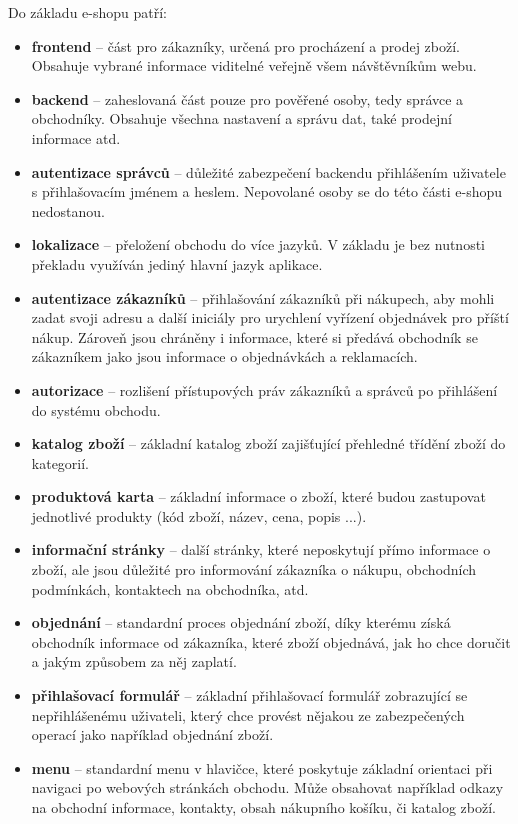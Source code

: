 \documentclass[11pt,twoside,a4paper]{book}
\begin{document}
Do základu e-shopu patří:
\begin{itemize}
\item \textbf{frontend} -- část pro zákazníky, určená pro procházení a prodej zboží. Obsahuje vybrané informace viditelné veřejně všem návštěvníkům webu.
\item \textbf{backend} -- zaheslovaná část pouze pro pověřené osoby, tedy správce a obchodníky. Obsahuje všechna nastavení a správu dat, také prodejní informace atd.
\item \textbf{autentizace správců} -- důležité zabezpečení backendu přihlášením uživatele s přihlašovacím jménem a heslem. Nepovolané osoby se do této části e-shopu nedostanou.
\item \textbf{lokalizace} -- přeložení obchodu do více jazyků. V základu je bez nutnosti překladu využíván jediný hlavní jazyk aplikace.
\item \textbf{autentizace zákazníků} -- přihlašování zákazníků při nákupech, aby mohli zadat svoji adresu a další iniciály pro urychlení vyřízení objednávek pro příští nákup. Zároveň jsou chráněny i informace, které si předává obchodník se zákazníkem jako jsou informace o objednávkách a reklamacích.
\item \textbf{autorizace} -- rozlišení přístupových práv zákazníků a správců po přihlášení do systému obchodu.
\item \textbf{katalog zboží} -- základní katalog zboží zajišťující přehledné třídění zboží do kategorií.
\item \textbf{produktová karta} -- základní informace o zboží, které budou zastupovat jednotlivé produkty (kód zboží, název, cena, popis ...).
\item \textbf{informační stránky} -- další stránky, které neposkytují přímo informace o zboží, ale jsou důležité pro informování zákazníka o nákupu, obchodních podmínkách, kontaktech na obchodníka, atd.
\item \textbf{objednání} -- standardní proces objednání zboží, díky kterému získá obchodník informace od zákazníka, které zboží objednává, jak ho chce doručit a jakým způsobem za něj zaplatí.
\item \textbf{přihlašovací formulář} -- základní přihlašovací formulář zobrazující se nepřihlášenému uživateli, který chce provést nějakou ze zabezpečených operací jako například objednání zboží.
\item \textbf{menu} -- standardní menu v hlavičce, které poskytuje základní orientaci při navigaci po webových stránkách obchodu. Může obsahovat například odkazy na obchodní informace, kontakty, obsah nákupního košíku, či katalog zboží.

\end{itemize}
\end{document}
